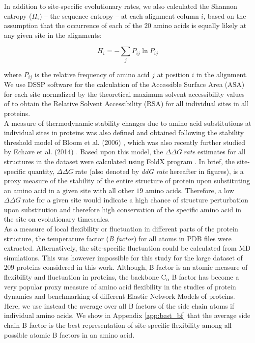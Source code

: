 \documentclass[11pt]{article}
\newcommand{\ddg}{$\Delta\Delta G~$}
\begin{document}
    In addition to site-specific evolutionary rates, we also calculated the Shannon entropy ($H_i$) -- the sequence entropy \citep[][]{shenkin_information-theoretical_1991} -- at each alignment column $i$, based on the assumption that the occurrence of each of the $20$ amino acids is equally likely at any given site in the alignments:

    \begin{equation}
        \label{eqn:shannon}
        H_i = -\sum_j P_{ij}\ln P_{ij}
    \end{equation}

    where $P_{ij}$ is the relative frequency of amino acid $j$ at position $i$ in the alignment. We use DSSP software \citep[][]{kabsch_dictionary_1983} for the calculation of the Accessible Surface Area (ASA) for each site normalized by the theoretical maximum solvent accessibility values of \citet{tien_maximum_2013} to obtain the Relative Solvent Accessibility (RSA) for all individual sites in all proteins. \\

    A measure of thermodynamic stability changes due to amino acid substitutions at individual sites in proteins was also defined and obtained following the stability threshold model of Bloom et al. (2006) \cite{bloom_structural_2006}, which was also recently further studied by Echave et al. (2014) \cite{echave_relationship_2014}. Based upon this model, the \ddg {\it rate} estimates for all structures in the dataset were calculated using FoldX program \citep[c.f.,][ for details of the methodology employed]{echave_relationship_2014}. In brief, the site-specific quantity, \ddg rate (also denoted by {\it ddG rate} hereafter in figures), is a proxy measure of the stability of the entire structure of protein upon substituting an amino acid in a given site with all other $19$ amino acids. Therefore, a low \ddg rate for a given site would indicate a high chance of structure perturbation upon substitution and therefore high conservation of the specific amino acid in the site on evolutionary timescales. \\
		
    As a measure of local flexibility or fluctuation in different parts of the protein structure, the temperature factor ({\it B factor}) for all atoms in PDB files were extracted. Alternatively, the site-specific fluctuation could be calculated from MD simulations. This was however impossible for this study for the large dataset of $209$ proteins considered in this work. Although, B factor is an atomic measure of flexibility and fluctuation in proteins, the backbone C$_\alpha$ B factor has become a very popular proxy measure of amino acid flexibility in the studies of protein dynamics and benchmarking of different Elastic Network Models of proteins. Here, we use instead the average over all B factors of the side chain atoms if individual amino acids. We show in Appendix \ref{app:best_bf} that the average side chain B factor is the best representation of site-specific flexibility among all possible atomic B factors in an amino acid. \\
\end{document}
